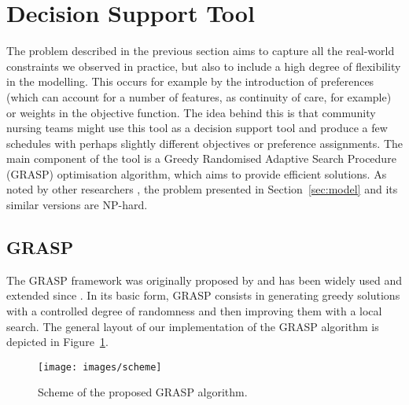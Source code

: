 \documentclass[a4paper,11pt,authoryear]{elsarticle}
\begin{document}

\section{Decision Support Tool}
\label{sec:dst}
\noindent The problem described in the previous section aims to capture all the real-world constraints we observed in practice, but also to include a high degree of flexibility in the modelling. This occurs for example by the introduction of preferences (which can account for a number of features, as continuity of care, for example) or weights in the objective function. The idea behind this is that community nursing teams might use this tool as a decision support tool and produce a few schedules with perhaps slightly different objectives or preference assignments. The main component of the tool is a Greedy Randomised Adaptive Search Procedure (GRASP) optimisation algorithm, which aims to provide efficient solutions. As noted by other researchers \cite[e.g.][]{bertels2006, rasmussen2012, mankowska2014}, the problem presented in Section~\ref{sec:model} and its similar versions are NP-hard.

\subsection{GRASP}
\label{sub:grasp}
\noindent The GRASP framework was originally proposed by \cite{feo1989} and has been widely used and extended since \citep{resende2016}. In its basic form, GRASP consists in generating greedy solutions with a controlled degree of randomness and then improving them with a local search. The general layout of our implementation of the GRASP algorithm is depicted in Figure~\ref{fig:graspdiagram}.

\begin{figure}[htb!]
    \centering
    \texttt{[image: images/scheme]}
    \caption{Scheme of the proposed GRASP algorithm.}
    \label{fig:graspdiagram}
\end{figure}
\end{document}
